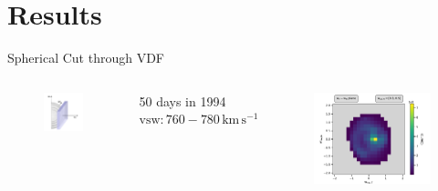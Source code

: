 \documentclass{beamer}
\begin{document}
\section{Results}
\begin{frame}{Spherical Cut through VDF}
\begin{columns}
	\column{2.5cm}
\begin{figure}
	\includegraphics[scale=.7]{Pics/slice_R2.pdf}
\end{figure}
{\scriptsize 50 days in 1994 \\
 $\mathrm{vsw} : 760 - 780 \, \mathrm{km\,s^{-1}}$
}
\column{7.5cm}
\begin{figure}
	\includegraphics[scale=.5]{Pics/cart_50_counts_R.pdf}
\end{figure}
\end{columns}
\end{frame}
\end{document}
